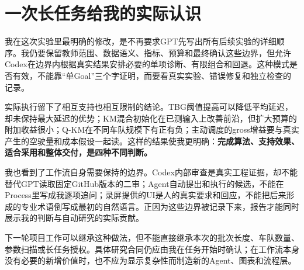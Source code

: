 \section{一次长任务给我的实际认识}
我在这次实验里最明确的修改，是不再要求GPT先写出所有后续实验的详细顺序。我仍要保留教师范围、数据语义、指标、预算和最终确认这些边界，但允许Codex在边界内根据真实结果安排必要的单项诊断、有限组合和回退。这种模式是否有效，不能靠“单Goal”三个字证明，而要看真实实验、错误修复和独立检查的记录。

实际执行留下了相互支持也相互限制的结论。TBG阈值提高可以降低平均延迟，却未保持最大延迟的优势；KM混合初始化在已测输入上改善前沿，但扩大预算的附加收益很小；Q-KM在不同车队规模下有正有负；主动调度的gross增益要与真实产生的空驶量和成本假设一起读。这样的结果使我更明确：\textbf{完成算法、支持效果、适合采用和整体交付，是四种不同判断。}

我也看到了工作流自身需要保持的边界。Codex内部审查是真实工程证据，却不能替代GPT读取固定GitHub版本的二审；Agent自动提出和执行的候选，不能在Process里写成我逐项追问；录屏提供的UI是人的真实要求和回应，不能把后来形成的专业术语倒写成最初的自然语言。正因为这些边界被记录下来，报告才能同时展示我的判断与自动研究的实际贡献。

下一轮项目工作可以继承这种做法，但不能直接继承本次的批次长度、车队数量、参数扫描或长任务授权。具体研究合同仍应由我在任务开始时确认；在工作流本身没有必要的新增价值时，也不应为显示复杂性而制造新的Agent、图表和流程层。